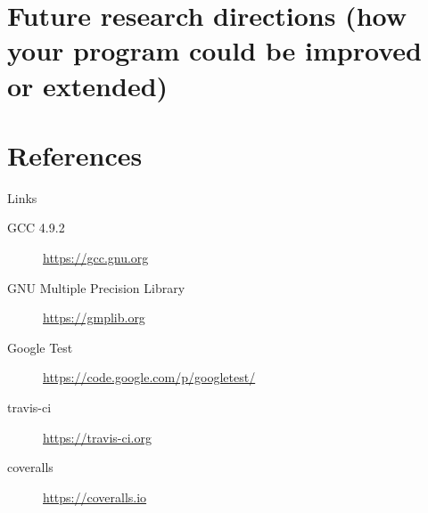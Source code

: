 \documentclass[presentation]{beamer}
\begin{document}
\section{Future research directions (how your program could be improved or extended)}
\label{sec-5}
\section{References}
\label{sec-6}
\begin{frame}[label=sec-6-1]{Links}
\begin{description}
\item[{GCC 4.9.2}] \url{https://gcc.gnu.org}
\item[{GNU Multiple Precision Library}] \url{https://gmplib.org}
\item[{Google Test}] \url{https://code.google.com/p/googletest/}
\item[{travis-ci}] \url{https://travis-ci.org}
\item[{coveralls}] \url{https://coveralls.io}
\end{description}
\end{frame}
\end{document}
